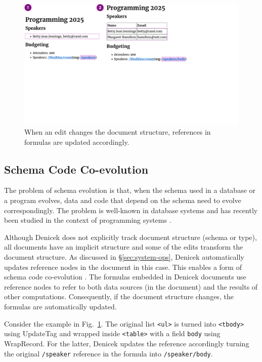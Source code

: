 \documentclass[sigconf,anonymous,screen]{acmart}
\newcommand{\ident}[1]{{\sffamily #1}}
\begin{document}
\begin{figure}[t]
\includegraphics[width=0.9\columnwidth,clip,trim=0cm 9.5cm 8cm 0cm]{fig/coevolution.pdf}
\caption{When an edit changes the document structure, references in formulas are updated accordingly.}
\label{fig:coevolution}
\end{figure}

\subsection{Schema Code Co-evolution}
\label{sec:impl-schema}

The problem of schema evolution is that, when the schema used in a database or a program evolves,
data and code that depend on the schema need to evolve correspondingly. The problem is well-known
in database systems \cite{rahm-2006-schema} and has recently been studied in the context of
programming systems \cite{edwards-2025-schema}.

Although Denicek does not explicitly track document structure (schema or type), all documents
have an implicit structure and some of the edits transform the document structure. As
discussed in \S\ref{sec:system-ops}, Denicek automatically updates reference nodes in the
document in this case. This enables a form of schema code co-evolution \cite{edwards-2025-schema}.
The formulas embedded in Denicek documents use reference nodes to refer to both data sources
(in the document) and the results of other computations. Consequently, if the document structure
changes, the formulas are automatically updated.

Consider the example in Fig.~\ref{fig:coevolution}. The original list {\small\Verb_<ul>_} is
turned into {\small\Verb_<tbody>_} using \ident{UpdateTag} and wrapped inside {\small\Verb_<table>_}
with a field {\small\Verb_body_} using \ident{WrapRecord}. For the latter, Denicek updates the
reference accordingly turning the original {\small\Verb_/speaker_} reference in the formula
into {\small\Verb_/speaker/body_}.
\end{document}
